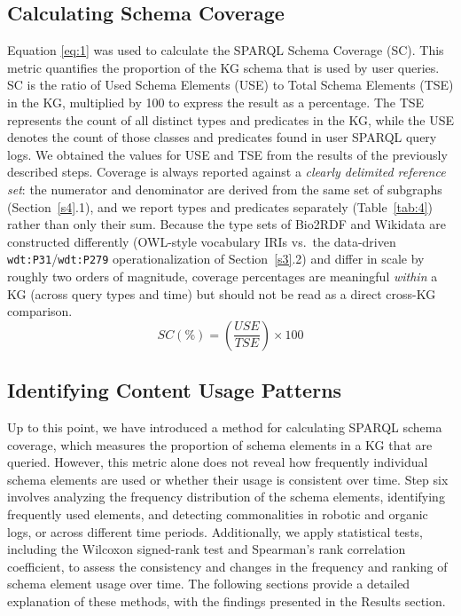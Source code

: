 \documentclass[sw]{iosart2x}
\begin{document}
\subsection{Calculating Schema Coverage}
Equation \ref{eq:1} was used to calculate the SPARQL Schema Coverage (SC). This metric quantifies the proportion of the KG schema that is used by user queries. SC is the ratio of Used Schema Elements (USE) to Total Schema Elements (TSE) in the KG, multiplied by 100 to express the result as a percentage. The TSE represents the count of all distinct types and predicates in the KG, while the USE denotes the count of those classes and predicates found in user SPARQL query logs. We obtained the values for USE and TSE from the results of the previously described steps. Coverage is always reported against a \emph{clearly delimited reference set}: the numerator and denominator are derived from the same set of subgraphs (Section~\ref{s4}.1), and we report types and predicates separately (Table~\ref{tab:4}) rather than only their sum. Because the type sets of Bio2RDF and Wikidata are constructed differently (OWL-style vocabulary IRIs vs.\ the data-driven \texttt{wdt:P31}/\texttt{wdt:P279} operationalization of Section~\ref{s3}.2) and differ in scale by roughly two orders of magnitude, coverage percentages are meaningful \emph{within} a KG (across query types and time) but should not be read as a direct cross-KG comparison.
\begin{equation}
SC (\%) = \left( \frac{USE}{TSE} \right) \times 100
\label{eq:1}
\end{equation}

\subsection{Identifying Content Usage Patterns}\label{sec:s6}
Up to this point, we have introduced a method for calculating SPARQL schema coverage, which measures the proportion of schema elements in a KG that are queried. However, this metric alone does not reveal how frequently individual schema elements are used or whether their usage is consistent over time. Step six involves analyzing the frequency distribution of the schema elements, identifying frequently used elements, and detecting commonalities in robotic and organic logs, or across different time periods. Additionally, we apply statistical tests, including the Wilcoxon signed-rank test and Spearman's rank correlation coefficient, to assess the consistency and changes in the frequency and ranking of schema element usage over time. The following sections provide a detailed explanation of these methods, with the findings presented in the Results section.
\end{document}
